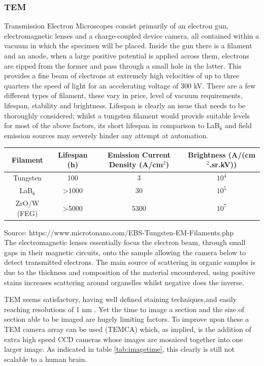 \documentclass[a4paper, 11pt]{article}
\numberwithin{equation}{section}
\begin{document}
\subsubsection{TEM}
Transmission Electron Microscopes consist primarily of an electron gun, electromagnetic lenses and a charge-coupled device camera, all contained within a vacuum in which the specimen will be placed. Inside the gun there is a filament and an anode, when a large positive potential is applied across them, electrons are ripped from the former and pass through a small hole in the latter. This provides a fine beam of electrons at extremely high velocities of up to three quarters the speed of light for an accelerating voltage of 300 kV\cite{beniac2010introduction}. There are a few different types of filament, these vary in price, level of vacuum requirements, lifespan, stability and brightness. Lifespan is clearly an issue that needs to be thoroughly considered; whilst a tungsten filament would provide suitable levels for most of the above factors, its short lifespan in comparison to LaB$_{6}$ and field emission sources may severely hinder any attempt at automation. 

\begin{center}
	 \label{tab:filaments}
	
	\begin{tabular}{ |c|c|c|c| } 
		\hline
		Filament      & Lifespan (h) & Emission Current Density (A/cm$^{2}$) & Brightness (A/(cm$^{2}$.sr.kV))\\ 
		\hline
		Tungsten          & 100         & 3		& $10^4$     \\ 
		LaB$_6$        & 	>1000       & 30     	&  $10^5$\\ 
		ZrO/W (FEG) & 	>5000       & 5300     & $10^7$\\
		\hline	
	\end{tabular}
\end{center}
\small{Source: https://www.microtonano.com/EBS-Tungsten-EM-Filaments.php}\\
\normalsize
The electromagnetic lenses essentially focus the electron beam, through small gaps in their magnetic circuits, onto the sample allowing the camera below to detect transmitted electrons. The main source of scattering in organic samples is due to the thickness and composition of the material encountered, using positive stains increases scattering around organelles whilst negative does the inverse\cite{egerton2006physical}.  

TEM seems satisfactory, having well defined staining techniques\cite{knott2008serial},\cite{egerton2006physical}and easily reaching resolutions of 1 nm \cite{EMFundementals}. Yet the time to image a section and the size of section able to be imaged are hugely limiting factors. To improve upon these a TEM camera array can be used (TEMCA) which, as implied, is the addition of extra high speed CCD cameras whose images are mosaiced together into one larger image. \cite{bock2011network} As indicated in table  \ref{tab:imagetime}, this clearly is still not scalable to a human brain. 
\end{document}
